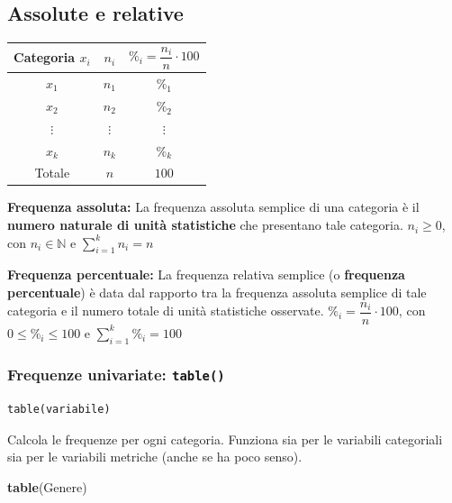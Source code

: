 \documentclass[
  a4paper,
  DIV=11,
  numbers=noendperiod]{scrreprt}
\newenvironment{Shaded}{\begin{snugshade}}{\end{snugshade}}
\newcommand{\FunctionTok}[1]{\textcolor[rgb]{0.13,0.29,0.53}{\textbf{#1}}}
\newcommand{\NormalTok}[1]{#1}
\begin{document}
\subsection{Assolute e relative}\label{assolute-e-relative}

\begin{table}[h]
\centering
\begin{tabular}{|c|c|c|}
\hline
Categoria $x_i$ & $n_i$ & $\%_i = \dfrac{n_i}{n}\cdot 100$ \\
\hline
$x_1$ & $n_1$ & $\%_1$ \\
$x_2$ & $n_2$ & $\%_2$ \\
$\vdots$ & $\vdots$ & $\vdots$ \\
$x_k$ & $n_k$ & $\%_k$ \\
\hline
Totale & $n$ & $100$ \\
\hline
\end{tabular}
\end{table}

\vspace{3mm}

\textbf{Frequenza assoluta:} La frequenza assoluta semplice di una
categoria è il \textbf{numero naturale di unità statistiche} che
presentano tale categoria. \quad \(n_i \geq 0\), con
\(n_i \in \mathbb{N}\) e \(\displaystyle\sum_{i=1}^{k} n_i = n\)

\vspace{2mm}

\textbf{Frequenza percentuale:} La frequenza relativa semplice (o
\textbf{frequenza percentuale}) è data dal rapporto tra la frequenza
assoluta semplice di tale categoria e il numero totale di unità
statistiche osservate. \quad \(\%_i = \dfrac{n_i}{n}\cdot100\), con
\(0 \leq \%_i \leq 100\) e \(\displaystyle\sum_{i=1}^{k}\%_i = 100\)

\subsubsection{\texorpdfstring{Frequenze univariate:
\texttt{table()}}{Frequenze univariate: table()}}\label{frequenze-univariate-table}

\begin{verbatim}
table(variabile)
\end{verbatim}

Calcola le frequenze per ogni categoria. Funziona sia per le variabili
categoriali sia per le variabili metriche (anche se ha poco senso).

\begin{Shaded}
\begin{Highlighting}[]
\FunctionTok{table}\NormalTok{(Genere)}
\end{Highlighting}
\end{Shaded}
\end{document}
